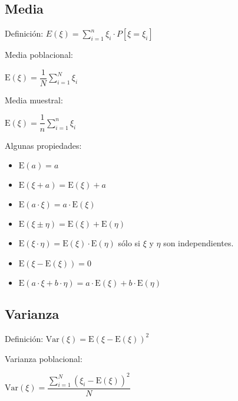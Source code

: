 \documentclass[10pt, a4paper, landscape]{article}
\newcommand{\E}{\mathrm{E}}
\newcommand{\Var}{\mathrm{Var}}
\begin{document}
\begin{multicols}{3}
		\subsection*{Media}
		
		Definición: \quad $E(\xi) = \sum_{i=1}^{n}\xi_{i} \cdot P[\xi = \xi_{i}]$
		
		\begin{multicols}{2}
			Media poblacional:
			
			\begin{center}
				$\E(\xi) = \dfrac{1}{N}\sum_{i=1}^{N}\xi_{i}$
			\end{center}
			
			\columnbreak
			
			Media muestral:
			
			\begin{center}
				$\E(\xi) = \dfrac{1}{n}\sum_{i=1}^{n}\xi_{i}$
			\end{center}
		\end{multicols}
		
		Algunas propiedades:
		
		\begin{itemize}[leftmargin=*]
			\item $\E(a) = a$
			\item $\E(\xi + a) = \E(\xi) + a$
			\item $\E(a \cdot \xi) = a \cdot \E(\xi)$
			\item $\E(\xi \pm \eta) = \E(\xi) + \E(\eta)$
			\item $\E(\xi \cdot \eta) = \E(\xi) \cdot \E(\eta)$ \quad sólo si $\xi$ y $\eta$ son independientes.
			\item $\E(\xi - \E(\xi)) = 0$
			\item $\E(a \cdot \xi + b \cdot \eta) = a \cdot \E(\xi) + b \cdot \E(\eta)$
		\end{itemize}
		
		\subsection*{Varianza}
		
		Definición: \quad $\Var(\xi) = \E(\xi - \E(\xi))^{2}$
		
		\begin{multicols}{2}
			Varianza poblacional:
			
			\begin{center}
				$\Var(\xi) = \dfrac{\sum_{i=1}^{N} (\xi_{i} - \E(\xi))^2}{N}$
			\end{center}
			

\end{multicols}
\end{multicols}
\end{document}
